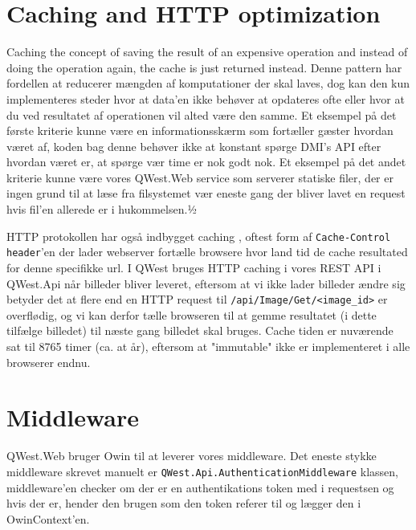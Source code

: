 \section{Caching and HTTP optimization}\label{sec:caching}
Caching the concept of saving the result of an expensive operation and instead of doing the operation again, the cache is just returned instead. Denne pattern har fordellen at reducerer mængden af komputationer der skal laves, dog kan den kun implementeres steder hvor at data'en ikke behøver at opdateres ofte eller hvor at du ved resultatet af operationen vil alted være den samme. Et eksempel på det første kriterie kunne være en informationsskærm som fortæller gæster hvordan været af, koden bag denne behøver ikke at konstant spørge DMI's API efter hvordan været er, at spørge vær time er nok godt nok. Et eksempel på det andet kriterie kunne være vores QWest.Web service som serverer statiske filer, der er ingen grund til at læse fra filsystemet vær eneste gang der bliver lavet en request hvis fil'en allerede er i hukommelsen.½

HTTP protokollen har også indbygget caching \cite{HTTPcaching}, oftest form af \texttt{Cache-Control header}'en der lader webserver fortælle browsere hvor land tid de cache resultated for denne specifikke url. I QWest bruges HTTP caching i vores REST API i QWest.Api når billeder bliver leveret, eftersom at vi ikke lader billeder ændre sig betyder det at flere end en HTTP request til \texttt{/api/Image/Get/<image\_id>} er overflødig, og vi kan derfor tælle browseren til at gemme resultatet (i dette tilfælge billedet) til næste gang billedet skal bruges. Cache tiden er nuværende sat til 8765 timer (ca. at år), eftersom at "immutable" ikke er implementeret i alle browserer endnu.

\section{Middleware}\label{sec:middleware}
QWest.Web bruger Owin \cite{Owin} til at leverer vores middleware. Det eneste stykke middleware skrevet manuelt er \texttt{QWest.Api.AuthenticationMiddleware} klassen, middleware'en checker om der er en authentikations token med i requestsen og hvis der er, hender den brugen som den token referer til og lægger den i OwinContext'en. 